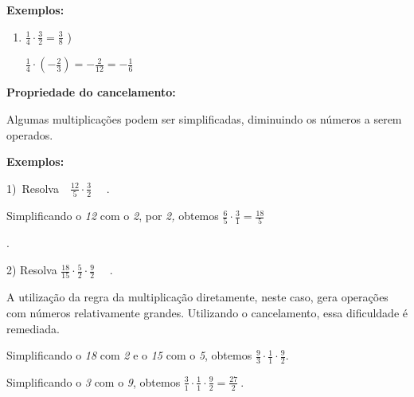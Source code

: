 \documentclass[12pt]{article}
\renewcommand{\_}{\kern-1.5pt\textunderscore\kern-1.5pt}
\begin{document}
\vspace{\baselineskip}
\setlength{\parskip}{0.0pt}
\tab \textbf{Exemplos:}\par

\begin{enumerate}
	\item  \( \frac{1}{4} \cdot \frac{3}{2}=\frac{3}{8} \) \tab \tab {}){\fontsize{16pt}{19.2pt}\selectfont   \( \frac{1}{4} \cdot  \left( -\frac{2}{3} \right) =-\frac{2}{12}=-\frac{1}{6} \) \par}
\end{enumerate}\par


\vspace{\baselineskip}
\textbf{Propriedade do cancelamento:}\par

Algumas multiplicações podem ser simplificadas, diminuindo os números a serem operados.\par

\textbf{Exemplos: }\par

1)\ Resolva\ \    \( \frac{12}{5} \cdot \frac{3}{2}\text{~~~ .} \) \par

Simplificando o \textit{12} com o \textit{2}, por \textit{2,} obtemos   \( \frac{6}{5} \cdot \frac{3}{1}=\frac{18}{5} \) {\fontsize{16pt}{19.2pt}\selectfont .\par}\par

2) Resolva\textbf{  \( \frac{18}{15} \cdot \frac{5}{2} \cdot \frac{9}{2}\text{~~~ .} \) }\par

\begin{adjustwidth}{0.2in}{0.0in}
\begin{justify}
A utilização da regra da multiplicação diretamente, neste caso, gera operações com números relativamente grandes. Utilizando o cancelamento, essa dificuldade é remediada.
\end{justify}\par

\end{adjustwidth}

Simplificando o \textit{18} com \textit{2} e o \textit{15} com o \textit{5}, obtemos  \( \frac{9}{3} \cdot \frac{1}{1} \cdot \frac{9}{2}. \) \par

Simplificando o \textit{3} com o \textit{9}, obtemos  \( \frac{3}{1} \cdot \frac{1}{1} \cdot \frac{9}{2}=\frac{27}{2}~. \) \tab \par
\end{document}
